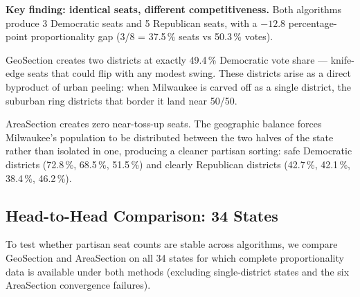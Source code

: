 \noindent\textbf{Key finding: identical seats, different competitiveness.}
Both algorithms produce 3 Democratic seats and 5 Republican seats, with a
$-12.8$ percentage-point proportionality gap (3/8 = 37.5\,\% seats vs
50.3\,\% votes).

GeoSection creates two districts at exactly 49.4\,\% Democratic vote share ---
knife-edge seats that could flip with any modest swing.
These districts arise as a direct byproduct of urban peeling: when Milwaukee
is carved off as a single district, the suburban ring districts that border
it land near 50/50.

AreaSection creates zero near-toss-up seats.
The geographic balance forces Milwaukee's population to be distributed between
the two halves of the state rather than isolated in one, producing a cleaner
partisan sorting: safe Democratic districts (72.8\,\%, 68.5\,\%, 51.5\,\%) and
clearly Republican districts (42.7\,\%, 42.1\,\%, 38.4\,\%, 46.2\,\%).

\subsection{Head-to-Head Comparison: 34 States}
\label{sec:head-to-head}

To test whether partisan seat counts are stable across algorithms, we compare
GeoSection and AreaSection on all 34 states for which complete proportionality
data is available under both methods (excluding single-district states and the
six AreaSection convergence failures).

